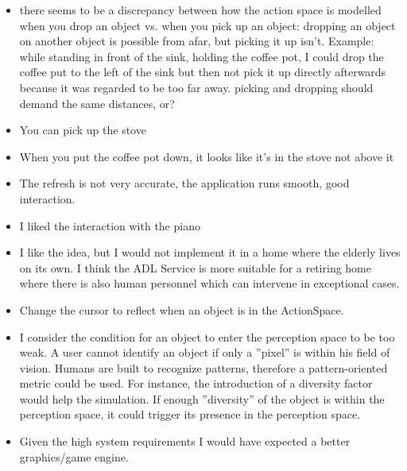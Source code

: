 \begin{itemize}
	\item there seems to be a discrepancy between how the action space is modelled when you drop an object vs. when you pick up an object: dropping an object on another object is possible from afar, but picking it up isn't. Example: while standing in front of the sink, holding the coffee pot, I could drop the coffee put to the left of the sink but then not pick it up directly afterwards because it was regarded to be too far away. picking and dropping should demand the same distances, or?
	\item You can pick up the stove
	\item When you put the coffee pot down, it looks like it's in the stove not above it
	\item The refresh is not very accurate, the application runs smooth, good interaction.
	\item I liked the interaction with the piano
	\item I like the idea, but I would not implement it in a home where the elderly lives on its own. I think the ADL Service is more suitable for a retiring home where there is also human personnel which can intervene in exceptional cases.
	\item Change the cursor to reflect when an object is in the ActionSpace.
	\item I consider the condition for an object to enter the perception space to be too weak. A user cannot identify an object if only a ''pixel'' is within his field of vision. Humans are built to recognize patterns, therefore a pattern-oriented metric could be used. For instance, the introduction of a diversity factor would help the simulation. If enough ''diversity'' of the object is within the perception space, it could trigger its presence in the perception space.
	\item Given the high system requirements I would have expected a better graphics/game engine.
\end{itemize}

